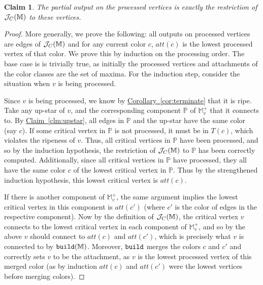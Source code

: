\documentclass[11pt]{article}
\newtheorem{claim}[theorem]{Claim}
\theoremstyle{definition}
\newcommand{\cJ}{{\cal J}}
\newcommand{\MM}{\mathbb{M}}
\newcommand{\PP}{\mathbb{P}}
\newcommand{\Clm}[1]{\hyperref[clm:#1]{Claim~\ref*{clm:#1}}} %
\newcommand{\Cor}[1]{\hyperref[cor:#1]{Corollary~\ref*{cor:#1}}} %
\newcommand{\build}{{\tt build}}
\newcommand{\h}{att}
\newcommand{\jc}{\cJ_C}
\newcommand{\rep}{rep}
\begin{document}
\begin{claim} \label{clm:process} The partial output on the processed vertices is exactly
the restriction of $\jc(\MM)$ to these vertices.
\end{claim}

\begin{proof} More generally, we prove the following: all outputs on processed vertices
are edges of $\jc(\MM)$ and for any current color $c$, $\h(c)$ is the lowest processed vertex
of that color. We prove this by induction on the processing order. The base case is is trivially
true, as initially the processed vertices and attachments of the color classes are the set of maxima.
For the induction step, consider the situation
when $v$ is being processed.

Since $v$ is being processed, we know by \Cor{terminate} that it is ripe. Take any up-star of $v$, and the corresponding component $\PP$
of $\MM^+_v$ that it connects to. By \Clm{upstar}, all edges in $\PP$ and the up-star
have the same color (say $c$). If some critical vertex in $\PP$ is not processed,
it must be in $T(c)$, which violates the ripeness of $v$.
Thus, all critical vertices in $\PP$ have been processed, and so by the induction hypothesis, the restriction of $\jc(\MM)$ to $\PP$ has been correctly computed.
Additionally, since all critical vertices in $\PP$ have processed, they all have the same color $c$ of the lowest critical vertex in $\PP$.
Thus by the strengthened induction hypothesis, this lowest critical vertex is $\h(c)$.

If there is another component of $\MM^+_v$, the same argument implies 
the lowest critical vertex in this component is $\h(c')$ (where $c'$ is the color of edges in the respective component).
Now by the definition of $\jc(\MM)$, the critical vertex $v$ connects to the lowest critical vertex in each component of $\MM^+_v$, 
and so by the above $v$ should connect to $\h(c)$ and $\h(c')$, which is precisely what $v$ is connected to by $\build(\MM)$.
Moreover, $\build$ merges the colors $c$ and $c'$ and correctly sets $v$ to be the attachment, 
as $v$ is the lowest processed vertex of this merged color (as by induction $\h(c)$ and $\h(c')$ were the lowest vertices before merging colors).


%
\end{proof}
\end{document}
